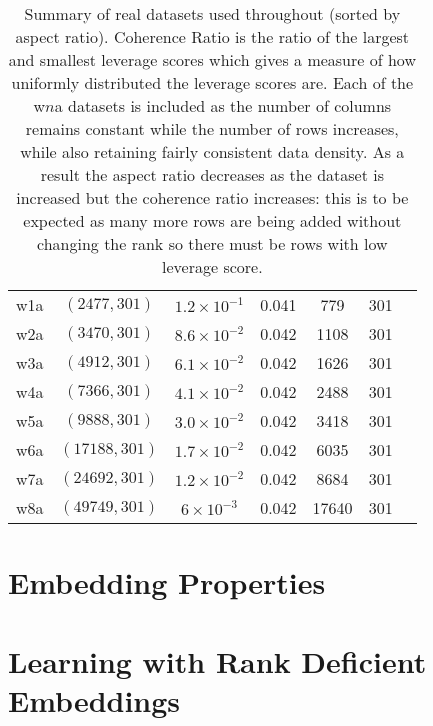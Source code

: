 \documentclass[twoside]{article}
\theoremstyle{definition}\newtheorem{thm}{Theorem}[section]
\theoremstyle{definition}\newtheorem{mydef}[thm]{Definition}
\theoremstyle{definition}\newtheorem{rem}[thm]{Remark}
\theoremstyle{definition}\newtheorem{prop}[thm]{Proposition}
\theoremstyle{definition}\newtheorem{example}[thm]{Example}
\theoremstyle{definition}\newtheorem{claim}[thm]{Claim}
\theoremstyle{definition}\newtheorem{Qu}[thm]{Question}
\theoremstyle{definition}\newtheorem{Lemma}[thm]{Lemma}
\theoremstyle{definition}\newtheorem{Cor}[thm]{Corollary}
\theoremstyle{definition}\newtheorem{Fact}[]{Fact}
\begin{document}
\begin{table}[ht]
\begin{adjustbox}{width=1\textwidth}
\begin{tabular}{|c|c|c|c|c|c|c|}
\hline

w1a & $(2477, 301)$    & $1.2 \times 10^{-1}$ & 0.041 & 779 & 301 & \cite{platt199912} \\

w2a & $(3470, 301)$    & $8.6 \times 10^{-2}$ & 0.042 & 1108 & 301 & \cite{platt199912} \\

w3a & $(4912, 301)$    & $6.1 \times 10^{-2}$ & 0.042 & 1626 & 301 & \cite{platt199912} \\

w4a & $(7366, 301)$    & $4.1 \times 10^{-2}$ & 0.042 & 2488 & 301 & \cite{platt199912} \\

w5a & $(9888, 301)$    & $3.0 \times 10^{-2}$ & 0.042 & 3418 & 301 & \cite{platt199912} \\

w6a & $(17188, 301)$ & $1.7 \times 10^{-2}$ & 0.042 & 6035 & 301 & \cite{platt199912} \\

w7a & $(24692, 301)$   & $1.2 \times 10^{-2}$ & 0.042 & 8684 & 301 & \cite{platt199912} \\

w8a & $(49749, 301)$    & $6 \times 10^{-3}$   & 0.042 & 17640 & 301 & \cite{platt199912} \\
\hline
\end{tabular}
\end{adjustbox}
\caption{Summary of real datasets used throughout (sorted by aspect ratio).
Coherence Ratio is the ratio of the largest and smallest leverage scores which
gives a measure of how uniformly distributed the leverage scores are.
Each of the w$n$a datasets is included as the number of columns remains constant
while the number of rows increases, while also retaining fairly consistent
data density.
As a result the aspect ratio decreases as the dataset is increased but the
coherence ratio increases: this is to be expected as many more rows are being
added without changing the rank so there must be rows with low leverage score.}
\label{table: data-facts}
\end{table}




\section{Embedding Properties} \label{sec: subspace-embedding-results}


\section{Learning with Rank Deficient Embeddings} \label{sec: ihs-rank-deficient}

\end{document}
